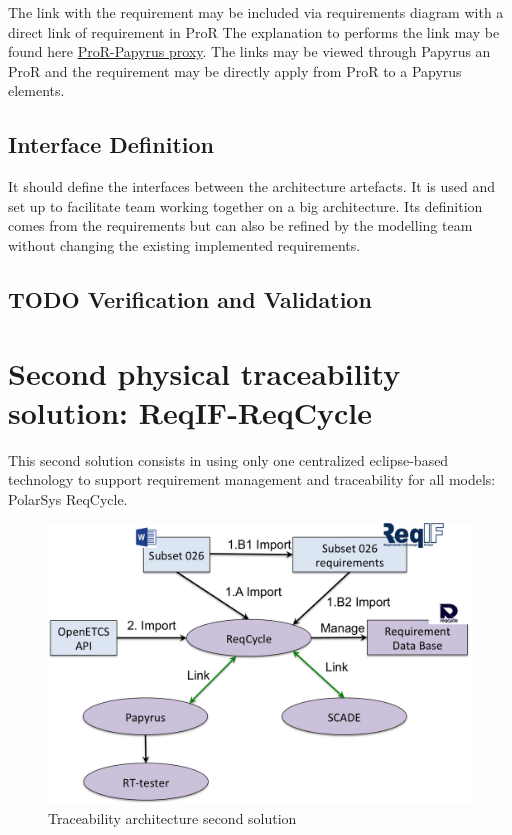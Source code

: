 \documentclass[11pt]{template/openetcs_report}
\begin{document}
The link with the requirement may be included via requirements diagram with a
direct link of requirement in ProR
The explanation to performs the link may be found here \href{https://github.com/openETCS/toolchain/wiki/User-Documentation#tracing-requirements-and-sysml-models}{ProR-Papyrus proxy}.
The links may be viewed through Papyrus an ProR and the requirement may be
directly apply from ProR to a Papyrus elements.


\section{Interface Definition}
\label{sec-9}

It should define the interfaces between the architecture artefacts.  It is used and
set up to facilitate team working together on a big architecture. Its definition
comes from the requirements but can also be refined by the modelling team without
changing the existing implemented requirements.



\section{{\bfseries\sffamily TODO} Verification and Validation}
\label{sec-11}

\chapter{Second physical traceability solution: ReqIF-ReqCycle}
\label{sec-6}

This second solution consists in using only one centralized eclipse-based technology to support requirement management and traceability for all models: PolarSys ReqCycle.

\begin{figure}[htb]
\centering
\includegraphics[width=.9\linewidth]{images/second_trace_solution.png}
\caption{\label{fig:trace_second}Traceability architecture second solution}
\end{figure}
\end{document}
